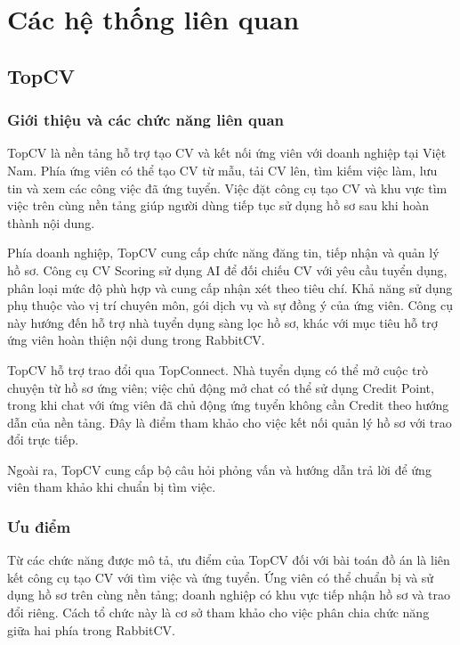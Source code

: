 \chapter{Các hệ thống liên quan}
\label{chap:related-systems}

\section{TopCV}
\label{sec:survey-topcv}

\subsection{Giới thiệu và các chức năng liên quan}

TopCV là nền tảng hỗ trợ tạo CV và kết nối ứng viên với doanh nghiệp tại Việt Nam. Phía ứng viên có thể tạo CV từ mẫu, tải CV lên, tìm kiếm việc làm, lưu tin và xem các công việc đã ứng tuyển. Việc đặt công cụ tạo CV và khu vực tìm việc trên cùng nền tảng giúp người dùng tiếp tục sử dụng hồ sơ sau khi hoàn thành nội dung.

Phía doanh nghiệp, TopCV cung cấp chức năng đăng tin, tiếp nhận và quản lý hồ sơ. Công cụ CV Scoring sử dụng AI để đối chiếu CV với yêu cầu tuyển dụng, phân loại mức độ phù hợp và cung cấp nhận xét theo tiêu chí. Khả năng sử dụng phụ thuộc vào vị trí chuyên môn, gói dịch vụ và sự đồng ý của ứng viên. Công cụ này hướng đến hỗ trợ nhà tuyển dụng sàng lọc hồ sơ, khác với mục tiêu hỗ trợ ứng viên hoàn thiện nội dung trong RabbitCV.

TopCV hỗ trợ trao đổi qua TopConnect. Nhà tuyển dụng có thể mở cuộc trò chuyện từ hồ sơ ứng viên; việc chủ động mở chat có thể sử dụng Credit Point, trong khi chat với ứng viên đã chủ động ứng tuyển không cần Credit theo hướng dẫn của nền tảng. Đây là điểm tham khảo cho việc kết nối quản lý hồ sơ với trao đổi trực tiếp.

Ngoài ra, TopCV cung cấp bộ câu hỏi phỏng vấn và hướng dẫn trả lời để ứng viên tham khảo khi chuẩn bị tìm việc.

\subsection{Ưu điểm}

Từ các chức năng được mô tả, ưu điểm của TopCV đối với bài toán đồ án là liên kết công cụ tạo CV với tìm việc và ứng tuyển. Ứng viên có thể chuẩn bị và sử dụng hồ sơ trên cùng nền tảng; doanh nghiệp có khu vực tiếp nhận hồ sơ và trao đổi riêng. Cách tổ chức này là cơ sở tham khảo cho việc phân chia chức năng giữa hai phía trong RabbitCV.

